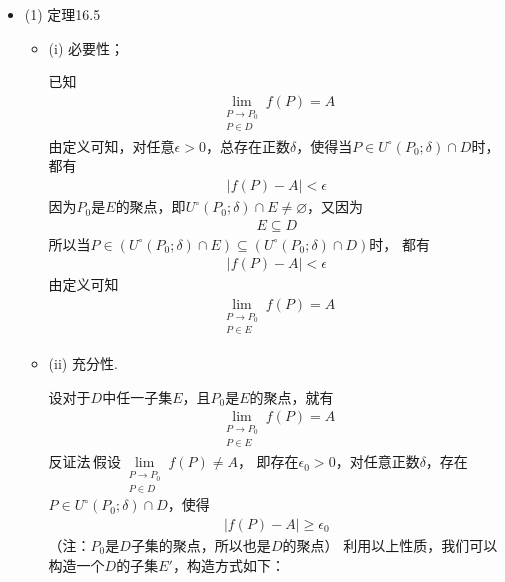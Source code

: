 \documentclass{article}
\begin{document}
\begin{itemize}
  \item (1) 定理16.5

        \begin{itemize}
          \item (i) 必要性；

                已知
                \begin{align*}
                  \lim\limits_{\substack{P \to P_0 \\ P \in D}} f(P) = A
                \end{align*}
                由定义可知，对任意$\epsilon > 0$，总存在正数$\delta$，使得当$P \in U^{\circ}(P_0; \delta) \cap D$时，
                都有
                \begin{align*}
                  |f(P) - A| < \epsilon
                \end{align*}
                因为$P_0$是$E$的聚点，即$U^{\circ}(P_0; \delta) \cap E \neq \varnothing$，又因为
                \begin{align*}
                  E \subseteq D
                \end{align*}
                所以当$P \in (U^{\circ}(P_0; \delta) \cap E) \subseteq (U^{\circ}(P_0; \delta) \cap D)$时，
                都有
                \begin{align*}
                  |f(P) - A| < \epsilon
                \end{align*}
                由定义可知
                \begin{align*}
                  \lim\limits_{\substack{P \to P_0 \\ P \in E}} f(P) = A
                \end{align*}

          \item (ii) 充分性.

                设对于$D$中任一子集$E$，且$P_0$是$E$的聚点，就有
                \begin{align*}
                  \lim\limits_{\substack{P \to P_0 \\ P \in E}} f(P) = A
                \end{align*}
                反证法$\, $假设$\lim\limits_{\substack{P \to P_0 \\ P \in D}} f(P) \neq A$，
                即存在$\epsilon_0 > 0$，对任意正数$\delta$，存在$P \in U^{\circ}(P_0; \delta) \cap D$，使得
                \begin{align*}
                  |f(P) - A| \geq \epsilon_0
                \end{align*}
                （注：$P_0$是$D$子集的聚点，所以也是$D$的聚点）
                利用以上性质，我们可以构造一个$D$的子集$E'$，构造方式如下：


\end{itemize}
\end{itemize}
\end{document}

